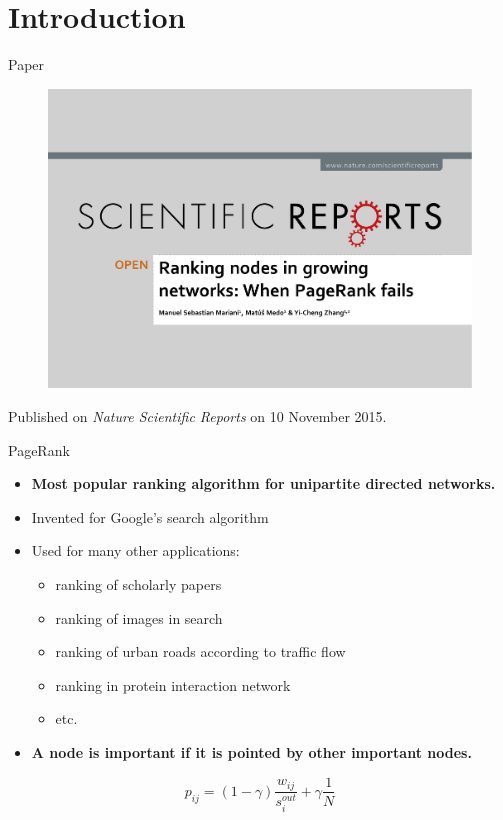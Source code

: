 \section{Introduction}
\begin{frame}{Paper}
    \begin{figure}
        \includegraphics[width=1.0\textwidth]{figures/Header}
    \end{figure}

    Published on \emph{Nature Scientific Reports} on 10 November 2015.
\end{frame}

\begin{frame}{PageRank}
    \begin{itemize}
        \item \textbf{Most popular ranking algorithm for unipartite directed networks.}
        \item Invented for Google's search algorithm
        \item Used for many other applications:
        \begin{itemize}
            \item ranking of scholarly papers
            \item ranking of images in search
            \item ranking of urban roads according to traffic flow
            \item ranking in protein interaction network
            \item etc.
        \end{itemize}
        \item \textbf{A node is important if it is pointed by other important nodes.}
    \end{itemize}
    \[
        p_{ij} = (1-\gamma) \frac{w_{ij}}{s_i^{out}} + \gamma \frac{1}{N}
    \]
\end{frame}

